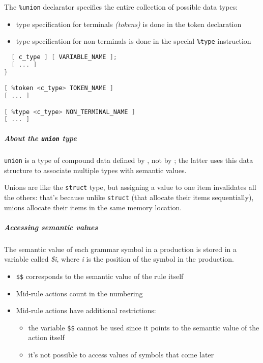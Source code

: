 \documentclass[english]{article}
\begin{document}
The \texttt{\%union} declarator specifies the entire collection of possible data types:

\begin{itemize}
  \item type specification for terminals \textit{(tokens)} is done in the token declaration
  \item type specification for non-terminals is done in the special \texttt{\%type} instruction
\end{itemize}

\begin{lstlisting}[language=C, morekeywords={token, option_t}, caption={Semantic value declaration}, label={lst:bison-semantic-value-declaration}]
%union {
  [ c_type ] [ VARIABLE_NAME ];
  [ ... ]
}

[ %token <c_type> TOKEN_NAME ]
[ ... ]

[ %type <c_type> NON_TERMINAL_NAME ]
[ ... ]
\end{lstlisting}

\subparagraph*{About the \texttt{union} type}
\texttt{union} is a type of compound data defined by \clang, not by \bison;
the latter uses this data structure to associate multiple types with semantic values.

Unions are like the \texttt{struct} type, but assigning a value to one item invalidates all the others:
that's because unlike \texttt{struct} (that allocate their items sequentially), unions allocate their items in the same memory location.

\subparagraph*{Accessing semantic values}
The semantic value of each grammar symbol in a production is stored in a variable called \textit{\$i}, where \textit{i} is the position of the symbol in the production.

\begin{itemize}
  \item \texttt{\$\$} corresponds to the semantic value of the rule itself
  \item Mid-rule actions count in the numbering
  \item Mid-rule actions have additional restrictions:
        \begin{itemize}
          \item the variable \texttt{\$\$} cannot be used since it points to the semantic value of the action itself
          \item it's not possible to access values of symbols that come later
        \end{itemize}
\end{itemize}
\end{document}
